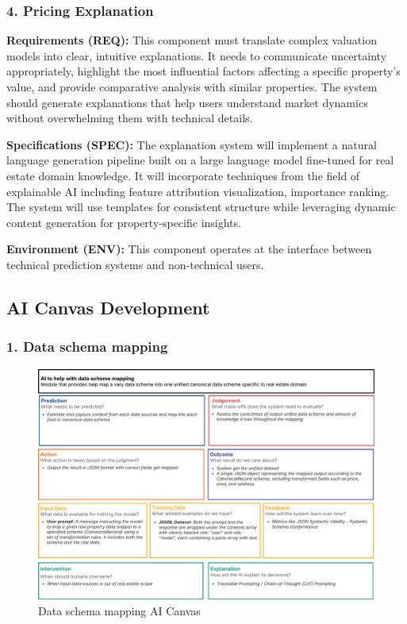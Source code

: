 \subsubsection*{4. Pricing Explanation}

\textbf{Requirements (REQ):} This component must translate complex valuation models into clear, intuitive explanations. It needs to communicate uncertainty appropriately, highlight the most influential factors affecting a specific property's value, and provide comparative analysis with similar properties. The system should generate explanations that help users understand market dynamics without overwhelming them with technical details.

\textbf{Specifications (SPEC):} The explanation system will implement a natural language generation pipeline built on a large language model fine-tuned for real estate domain knowledge. It will incorporate techniques from the field of explainable AI including feature attribution visualization, importance ranking. The system will use templates for consistent structure while leveraging dynamic content generation for property-specific insights.

\textbf{Environment (ENV):} This component operates at the interface between technical prediction systems and non-technical users.

\newpage

\subsection{AI Canvas Development}

\subsubsection{1. Data schema mapping}

\begin{figure}[htbp]
	\centering
	\includegraphics[width=1\textwidth]{assets/ai/ai-canvas-2.png}
	\caption{Data schema mapping AI Canvas}
	\label{fig:ai-canvas-1}
\end{figure}


